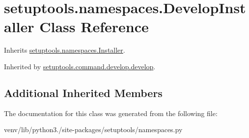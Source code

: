 \hypertarget{classsetuptools_1_1namespaces_1_1_develop_installer}{}\section{setuptools.\+namespaces.\+Develop\+Installer Class Reference}
\label{classsetuptools_1_1namespaces_1_1_develop_installer}


Inherits \hyperlink{classsetuptools_1_1namespaces_1_1_installer}{setuptools.\+namespaces.\+Installer}.



Inherited by \hyperlink{classsetuptools_1_1command_1_1develop_1_1develop}{setuptools.\+command.\+develop.\+develop}.

\subsection*{Additional Inherited Members}


The documentation for this class was generated from the following file\+:\begin{DoxyCompactItemize}
\item 
venv/lib/python3./site-\/packages/setuptools/namespaces.\+py\end{DoxyCompactItemize}

